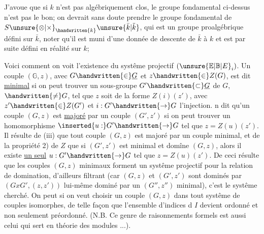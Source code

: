 J'avoue que si $k$ n'est pas algébriquement clos, le groupe fondamental ci-dessus n'est   pas le bon; on devrait sans doute prendre le groupe fondamental de $S\unsure{\otimes|\times}_{\handwritten{k}}\unsure{\bar{k}|\ddot{k}}$, qui est un groupe proalgébrique défini sur $\bar{k}$, noter qu'il est muni d'une donnée de descente de $\bar{k}$ à $k$ et est par suite défini en réalité sur $k$; 



Voici comment on voit l'existence du systême projectif $(\unsure{\mathbb{E}|\mathbb{B}|E}_i)$. Un couple $(\mathbb{G},z)$, avec $G\handwritten{\in}\underline{G}$ et $z\handwritten{\in}Z(G)$, est dit \uline{minimal} si on  peut trouver un sous-groupe $G'\handwritten{\subset}\underline{G}$ de $G$,  $\handwritten{\ne}G$, tel que $z$ soit  de la forme $Z(i)(z')$, avec $z'\handwritten{\in}Z(G')$ et $i:G'\handwritten{\to}G$ l'injection.  n dit qu'un couple $(G,z)$ est \uline{majoré} par un couple $(G',z')$ si on peut trouver un homomorphisme $\inserted{u:}G'\handwritten{\to}G$ tel que $z=Z(u)(z')$. Il résulte de (iii) que tout couple $(G,z)$ est majoré par un couple minimal, et de la propriété 2) de $Z$ que si $(G',z')$ est minimal et domîne $(G,z)$, alors il existe \uline{un seul} $u:G'\handwritten{\to}G$ tel que $z=Z(u)(z')$. De ceci résulte que les couples $(G,z)$ minimaux forment un systême projectif pour la relation de domination, d'ailleurs filtrant (car $(G,z)$ et $(G',z')$ sont dominés par $(GxG',(z,z'))$ lui-même dominé par un $(G'',z'')$ minimal), c'est le systême cherché. On peut si on veut choisir un couple $(G,z)$ dans tout systême de couples  isomorphes, de  telle façon que l'ensemble d'indices d $I$ devient ordonné et non seulement préordonné. (N.B. Ce genre de raisonnements formels est aussi celui qui sert en théorie des  modules ...).

